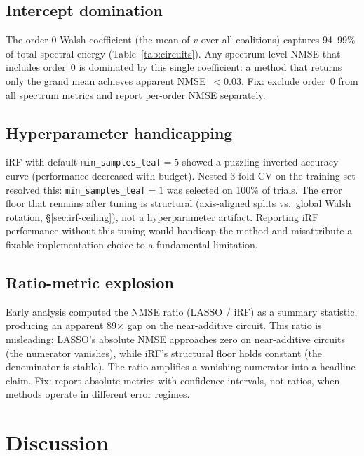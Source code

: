 \documentclass[11pt]{article}
\begin{document}
\subsection{Intercept domination}

The order-0 Walsh coefficient (the mean of $v$ over all coalitions)
captures 94--99\% of total spectral energy
(Table~\ref{tab:circuits}). Any spectrum-level NMSE that includes
order~0 is dominated by this single coefficient: a method that
returns only the grand mean achieves apparent NMSE~$< 0.03$. Fix:
exclude order~0 from all spectrum metrics and report per-order NMSE
separately.

\subsection{Hyperparameter handicapping}

iRF with default \texttt{min\_samples\_leaf}$=5$ showed a puzzling
inverted accuracy curve (performance decreased with budget). Nested
3-fold CV on the training set resolved this:
\texttt{min\_samples\_leaf}$=1$ was selected on 100\% of trials.
The error floor that remains after tuning is structural
(axis-aligned splits vs.\ global Walsh rotation,
\S\ref{sec:irf-ceiling}), not a hyperparameter artifact.
Reporting iRF performance without this tuning would handicap the
method and misattribute a fixable implementation choice to a
fundamental limitation.

\subsection{Ratio-metric explosion}

Early analysis computed the NMSE ratio (LASSO / iRF) as a summary
statistic, producing an apparent 89$\times$ gap on the near-additive
circuit. This ratio is misleading: LASSO's absolute NMSE approaches
zero on near-additive circuits (the numerator vanishes), while
iRF's structural floor holds constant (the denominator is stable).
The ratio amplifies a vanishing numerator into a headline claim.
Fix: report absolute metrics with confidence intervals, not ratios,
when methods operate in different error regimes.


\section{Discussion}
\label{sec:discussion}
\end{document}

